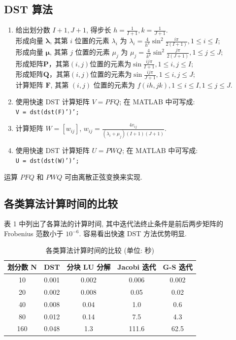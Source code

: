 \subsection{DST 算法}


\begin{enumerate}[label=步 \arabic*.]
    \item 给出划分数 $I+1, J+1$, 得步长 $h = \frac{1}{I+1}, k = \frac{1}{J+1}$. \\
    形成向量 $\boldsymbol{\lambda}$, 其第 $i$ 位置的元素 $\lambda_i$ 为 $\lambda_i = \frac{4}{h^2} \sin^2 \frac{i\pi}{2(I+1)}, 1 \leq i \leq I$; \\
    形成向量 $\boldsymbol{\mu}$, 其第 $j$ 位置的元素 $\mu_j$ 为 $\mu_j = \frac{4}{k^2} \sin^2 \frac{j\pi}{2(J+1)}, 1 \leq j \leq J$; \\
    形成矩阵$\bm{P}$，其第$(i,j)$位置的元素为$\sin\frac{ij\pi}{I+1},1\leq i,j\leq I$;\\
    形成矩阵$\bm{Q}$，其第$(i,j)$位置的元素为$\sin\frac{ij\pi}{J+1},1\leq i,j\leq J$;\\
    计算矩阵 $\bm{F}$, 其第 $(i, j)$ 位置的元素为 $f(ih, jk), 1 \leq i \leq I, 1 \leq j \leq J$.
    
    \item 使用快速 DST 计算矩阵 $V = PFQ$; 在 MATLAB 中可写成: \\
    \texttt{V = dst(dst(F)')';}
    
    \item 计算矩阵 $W = [w_{ij}]$, $w_{ij} = \frac{4v_{ij}}{(\lambda_i + \mu_j)(I+1)(J+1)}.$
    \item 使用快速 DST 计算矩阵 $U = PWQ$; 在 MATLAB 中可写成: \\
    \texttt{U = dst(dst(W)')';}
\end{enumerate}


运算 $PFQ$ 和 $PWQ$ 可由离散正弦变换来实现.

\subsection{各类算法计算时间的比较}
表 1 中列出了各算法的计算时间, 其中迭代法终止条件是前后两步矩阵的 Frobenius 范数小于 $10^{-6}$. 容易看出快速 DST 方法优势明显.

\begin{table}[H]
\centering
\caption{各类算法计算时间的比较 (单位: 秒)}
\begin{tabular}{c|c|c|c|c}
\hline
划分数 N & DST & 分块 LU 分解 & Jacobi 迭代 & G-S 迭代 \\ \hline
10 & 0.001 & 0.002 & 0.006 & 0.002 \\ \hline
20 & 0.002 & 0.008 & 0.05 & 0.02 \\ \hline
40 & 0.008 & 0.04 & 1.0 & 0.6 \\ \hline
80 & 0.012 & 0.14 & 7.5 & 4.3 \\ \hline
160 & 0.048 & 1.3 & 111.6 & 62.5 \\ \hline
\end{tabular}
\end{table}

